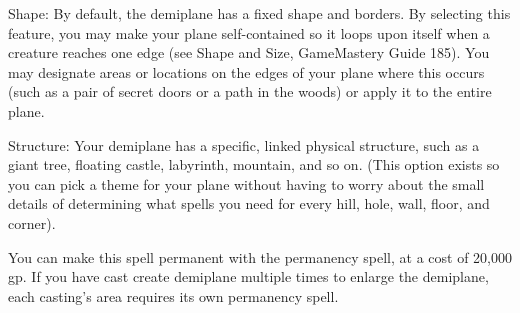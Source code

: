 {Shape: By default, the demiplane has a fixed shape and borders. By selecting this feature, you may make your plane self-contained so it loops upon itself when a creature reaches one edge (see Shape and Size, GameMastery Guide 185). You may designate areas or locations on the edges of your plane where this occurs (such as a pair of secret doors or a path in the woods) or apply it to the entire plane.

Structure: Your demiplane has a specific, linked physical structure, such as a giant tree, floating castle, labyrinth, mountain, and so on. (This option exists so you can pick a theme for your plane without having to worry about the small details of determining what spells you need for every hill, hole, wall, floor, and corner).

You can make this spell permanent with the permanency spell, at a cost of 20,000 gp. If you have cast create demiplane multiple times to enlarge the demiplane, each casting's area requires its own permanency spell.}
        
